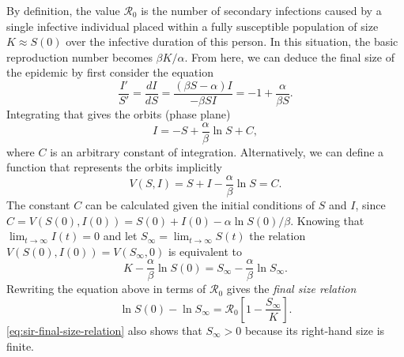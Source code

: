 By definition, the value $\mathcal{R}_0$ is the number of secondary infections caused by a single infective individual placed within a fully susceptible population of size $K \approx S(0)$ over the infective duration of this person.
In this situation, the basic reproduction number becomes $\beta K / \alpha$.
From here, we can deduce the final size of the epidemic by first consider the equation
\begin{equation}
    \frac{I'}{S'} = \frac{dI}{dS} = \frac{(\beta S - \alpha) I}{- \beta S I} = -1 + \frac{\alpha}{\beta S}.
\end{equation}
Integrating that gives the orbits (phase plane)
\begin{equation}
    I = -S + \frac{\alpha}{\beta} \ln S + C,
    \label{eq:sir-I-wrt-S-orbits}
\end{equation}
where $C$ is an arbitrary constant of integration.
Alternatively, we can define a function that represents the orbits implicitly
\begin{equation}
    V(S, I) = S + I - \frac{\alpha}{\beta} \ln S = C.
\end{equation}
The constant $C$ can be calculated given the initial conditions of $S$ and $I$, since $C = V(S(0), I(0)) = S(0) + I(0) - \alpha \ln S(0) / \beta$.
Knowing that $\lim_{t \to \infty} I(t) = 0$ and let $S_\infty = \lim_{t \to \infty} S(t)$ the relation $V(S(0), I(0)) = V(S_\infty, 0)$ is equivalent to
\begin{equation}
    K - \frac{\alpha}{\beta} \ln S(0) = S_\infty - \frac{\alpha}{\beta} \ln S_\infty.
\end{equation}
Rewriting the equation above in terms of $\mathcal{R}_0$ gives the \textit{final size relation}
\begin{equation}
    \ln S(0) - \ln S_\infty = \mathcal{R}_0 \left[ 1 - \frac{S_\infty}{K} \right].
    \label{eq:sir-final-size-relation}
\end{equation}
\autoref{eq:sir-final-size-relation} also shows that $S_\infty > 0$ because its right-hand size is finite.

